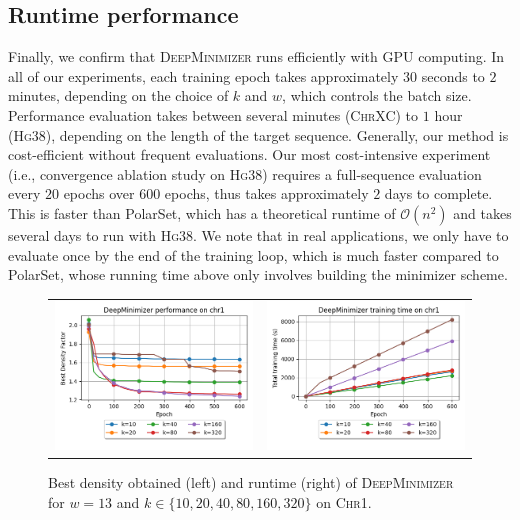 \subsection{Runtime performance} Finally, we confirm that \textsc{DeepMinimizer} runs efficiently with GPU computing. In all of our experiments, each training epoch takes approximately $30$ seconds to $2$ minutes, depending on the choice of $k$ and $w$, which controls the batch size. Performance evaluation takes between several minutes (\textsc{ChrXC}) to $1$ hour (\textsc{Hg38}), depending on the length of the target sequence. Generally, our method is cost-efficient without frequent evaluations. Our most cost-intensive experiment (i.e., convergence ablation study on \textsc{Hg38}) requires a full-sequence evaluation every $20$ epochs over $600$ epochs, thus takes approximately $2$ days to complete. This is faster than PolarSet, which has a theoretical runtime of $\mathcal{O}(n^2)$ and takes several days to run with \textsc{Hg38}. We note that in real applications, we only have to evaluate once by the end of the training loop, which is much faster compared to PolarSet, whose running time above only involves building the minimizer scheme. 
\begin{figure}[h]
\centering
\begin{tabular}{cc}
\includegraphics[width=0.45\columnwidth]{minimizer_plots/largek_chr1_w13.png} &
\includegraphics[width=0.45\columnwidth]{minimizer_plots/time_chr1_w13.png} 
\end{tabular}
\caption{Best density obtained (left) and runtime (right) of \textsc{DeepMinimizer} for $w=13$ and $k\in \{10, 20, 40, 80, 160, 320\}$ on \textsc{Chr1}.}
\label{app-msd-fig:7}
\end{figure}

